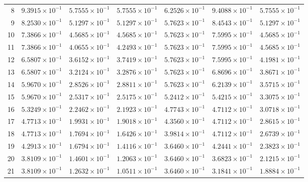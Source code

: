 \begin{table}[H]
\begin{tabular}{@{}rrrrrrr@{}}
8 & $9.3915\times10^{-1}$ & $5.7555\times10^{-1}$ & $5.7555\times10^{-1}$ & $6.2526\times10^{-1}$ & $9.4088\times10^{-1}$ & $5.7555\times10^{-1}$\\
9 & $8.2530\times10^{-1}$ & $5.1297\times10^{-1}$ & $5.1297\times10^{-1}$ & $5.7623\times10^{-1}$ & $8.4543\times10^{-1}$ & $5.1297\times10^{-1}$\\
10 & $7.3866\times10^{-1}$ & $4.5685\times10^{-1}$ & $4.5685\times10^{-1}$ & $5.7623\times10^{-1}$ & $7.5995\times10^{-1}$ & $4.5685\times10^{-1}$\\
11 & $7.3866\times10^{-1}$ & $4.0655\times10^{-1}$ & $4.2493\times10^{-1}$ & $5.7623\times10^{-1}$ & $7.5995\times10^{-1}$ & $4.5685\times10^{-1}$\\
12 & $6.5807\times10^{-1}$ & $3.6152\times10^{-1}$ & $3.7419\times10^{-1}$ & $5.7623\times10^{-1}$ & $7.5995\times10^{-1}$ & $4.1981\times10^{-1}$\\
13 & $6.5807\times10^{-1}$ & $3.2124\times10^{-1}$ & $3.2876\times10^{-1}$ & $5.7623\times10^{-1}$ & $6.8696\times10^{-1}$ & $3.8671\times10^{-1}$\\
14 & $5.9670\times10^{-1}$ & $2.8526\times10^{-1}$ & $2.8811\times10^{-1}$ & $5.7623\times10^{-1}$ & $6.2139\times10^{-1}$ & $3.5715\times10^{-1}$\\
15 & $5.9670\times10^{-1}$ & $2.5317\times10^{-1}$ & $2.5175\times10^{-1}$ & $5.2412\times10^{-1}$ & $5.4215\times10^{-1}$ & $3.3075\times10^{-1}$\\
16 & $5.3249\times10^{-1}$ & $2.2462\times10^{-1}$ & $2.1923\times10^{-1}$ & $4.7743\times10^{-1}$ & $4.7112\times10^{-1}$ & $3.0718\times10^{-1}$\\
17 & $4.7713\times10^{-1}$ & $1.9931\times10^{-1}$ & $1.9018\times10^{-1}$ & $4.3560\times10^{-1}$ & $4.7112\times10^{-1}$ & $2.8615\times10^{-1}$\\
18 & $4.7713\times10^{-1}$ & $1.7694\times10^{-1}$ & $1.6426\times10^{-1}$ & $3.9814\times10^{-1}$ & $4.7112\times10^{-1}$ & $2.6739\times10^{-1}$\\
19 & $4.2913\times10^{-1}$ & $1.6794\times10^{-1}$ & $1.4116\times10^{-1}$ & $3.6460\times10^{-1}$ & $4.2441\times10^{-1}$ & $2.3823\times10^{-1}$\\
20 & $3.8109\times10^{-1}$ & $1.4601\times10^{-1}$ & $1.2063\times10^{-1}$ & $3.6460\times10^{-1}$ & $3.6823\times10^{-1}$ & $2.1215\times10^{-1}$\\
21 & $3.8109\times10^{-1}$ & $1.2632\times10^{-1}$ & $1.0511\times10^{-1}$ & $3.6460\times10^{-1}$ & $3.1841\times10^{-1}$ & $1.8884\times10^{-1}$\\

\end{tabular}
\end{table}
